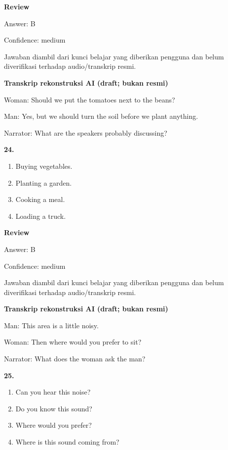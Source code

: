 \documentclass[12pt]{article}
\begin{document}
\par
\begingroup
\setlength{\parskip}{0pt}
\setlength{\parindent}{0pt}
\textbf{Review}\par
Answer: B\par
Confidence: medium\par
Jawaban diambil dari kunci belajar yang diberikan pengguna dan belum diverifikasi terhadap audio/transkrip resmi.\par
\endgroup
\par
\vspace{0.25\baselineskip}
\begin{exampleblock}
\textbf{Transkrip rekonstruksi AI (draft; bukan resmi)}\par
Woman: Should we put the tomatoes next to the beans?\par
Man: Yes, but we should turn the soil before we plant anything.\par
Narrator: What are the speakers probably discussing?\par
\end{exampleblock}
\noindent\textbf{24.}
\begin{enumerate}[label=(\Alph*),leftmargin=*,itemsep=0.2em]
\item Buying vegetables.
\item Planting a garden.
\item Cooking a meal.
\item Loading a truck.
\end{enumerate}
\par
\begingroup
\setlength{\parskip}{0pt}
\setlength{\parindent}{0pt}
\textbf{Review}\par
Answer: B\par
Confidence: medium\par
Jawaban diambil dari kunci belajar yang diberikan pengguna dan belum diverifikasi terhadap audio/transkrip resmi.\par
\endgroup
\par
\vspace{0.25\baselineskip}
\begin{exampleblock}
\textbf{Transkrip rekonstruksi AI (draft; bukan resmi)}\par
Man: This area is a little noisy.\par
Woman: Then where would you prefer to sit?\par
Narrator: What does the woman ask the man?\par
\end{exampleblock}
\noindent\textbf{25.}
\begin{enumerate}[label=(\Alph*),leftmargin=*,itemsep=0.2em]
\item Can you hear this noise?
\item Do you know this sound?
\item Where would you prefer?
\item Where is this sound coming from?
\end{enumerate}
\end{document}
